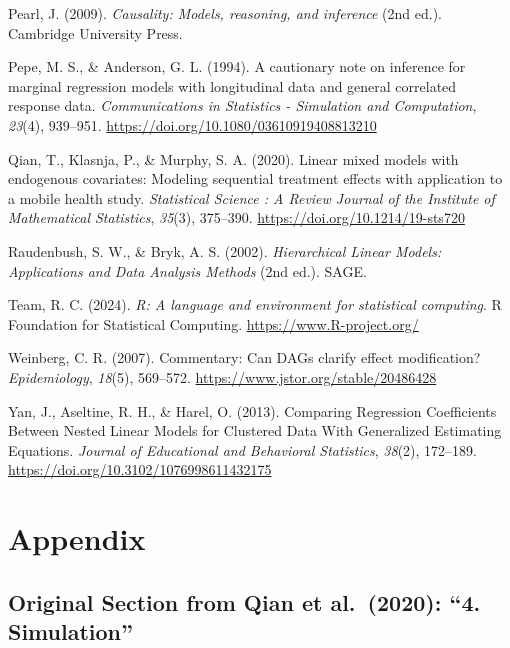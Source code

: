 \documentclass[
  12pt,
  a4paper,
]{article}
\newlength{\cslhangindent}
\newenvironment{CSLReferences}[2] %
 {\begin{list}{}{%
  \setlength{\itemindent}{0pt}
  \setlength{\leftmargin}{0pt}
  \setlength{\parsep}{0pt}
  \ifodd #1
   \setlength{\leftmargin}{\cslhangindent}
   \setlength{\itemindent}{-1\cslhangindent}
  \fi
  \setlength{\itemsep}{#2\baselineskip}}}
 {\end{list}}
\begin{document}
\begin{CSLReferences}{1}{0}
Pearl, J. (2009). \emph{Causality: Models, reasoning, and inference}
(2nd ed.). Cambridge University Press.

Pepe, M. S., \& Anderson, G. L. (1994). A cautionary note on inference
for marginal regression models with longitudinal data and general
correlated response data. \emph{Communications in Statistics -
Simulation and Computation}, \emph{23}(4), 939--951.
\url{https://doi.org/10.1080/03610919408813210}

Qian, T., Klasnja, P., \& Murphy, S. A. (2020). Linear mixed models with
endogenous covariates: Modeling sequential treatment effects with
application to a mobile health study. \emph{Statistical Science : A
Review Journal of the Institute of Mathematical Statistics},
\emph{35}(3), 375--390. \url{https://doi.org/10.1214/19-sts720}

Raudenbush, S. W., \& Bryk, A. S. (2002). \emph{Hierarchical Linear
Models: Applications and Data Analysis Methods} (2nd ed.). SAGE.

Team, R. C. (2024). \emph{R: A language and environment for statistical
computing}. R Foundation for Statistical Computing.
\url{https://www.R-project.org/}

Weinberg, C. R. (2007). Commentary: Can DAGs clarify effect
modification? \emph{Epidemiology}, \emph{18}(5), 569--572.
\url{https://www.jstor.org/stable/20486428}

Yan, J., Aseltine, R. H., \& Harel, O. (2013). Comparing Regression
Coefficients Between Nested Linear Models for Clustered Data With
Generalized Estimating Equations. \emph{Journal of Educational and
Behavioral Statistics}, \emph{38}(2), 172--189.
\url{https://doi.org/10.3102/1076998611432175}

\end{CSLReferences}

\section{Appendix}\label{appendix}

\subsection{Original Section from Qian et al.~(2020): ``4.
Simulation''}\label{original-section-from-qian-et-al.-2020-4.-simulation}
\end{document}
